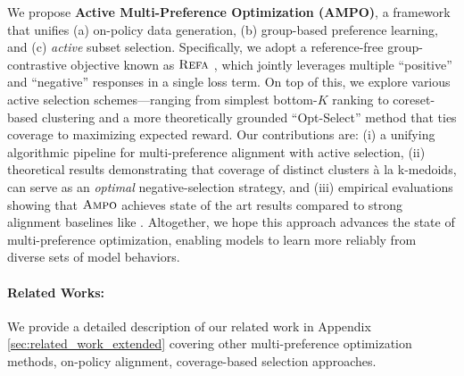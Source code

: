 \vspace{-0.05in}
We propose \textbf{Active Multi-Preference Optimization (AMPO)}, a framework that unifies (a) on-policy data generation, (b) group-based preference learning, and (c) \emph{active} subset selection. Specifically, we adopt a reference-free group-contrastive objective known as \(\textsc{Refa}\) \citep{gupta2024refa}, which jointly leverages multiple “positive” and “negative” responses in a single loss term. On top of this, we explore various active selection schemes—ranging from simplest bottom-$K$ ranking \citep{meng2024simpo} to coreset-based clustering \citep{cohen2021new, cohen2022improved, huang2019coresets} and a more theoretically grounded “Opt-Select” method that ties coverage to maximizing expected reward. Our contributions are: 
(i) a unifying algorithmic pipeline for multi-preference alignment with active selection, 
(ii) theoretical results demonstrating that coverage of distinct clusters 
à la k-medoids, can serve as an \emph{optimal} negative-selection strategy, 
and (iii) empirical evaluations showing that $\textsc{Ampo}$ achieves state of the art results compared to strong alignment baselines like \simpo.
Altogether, we hope this approach advances the state of multi-preference optimization, enabling models to learn more reliably from diverse sets of model behaviors.

\vspace{-0.15in}
\paragraph{Related Works:}
We provide a detailed description of our related work in Appendix  \ref{sec:related_work_extended} covering other multi-preference optimization methods, on-policy alignment, coverage-based selection approaches.
